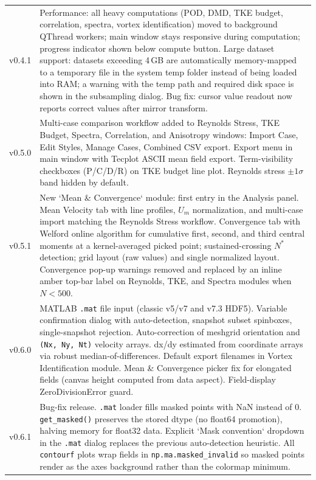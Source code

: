 \begin{longtable}{lp{12cm}}
v0.4.1 & Performance: all heavy computations (POD, DMD, TKE budget, correlation, spectra, vortex identification) moved to background QThread workers; main window stays responsive during computation; progress indicator shown below compute button. Large dataset support: datasets exceeding 4\,GB are automatically memory-mapped to a temporary file in the system temp folder instead of being loaded into RAM; a warning with the temp path and required disk space is shown in the subsampling dialog. Bug fix: cursor value readout now reports correct values after mirror transform. \\
v0.5.0 & Multi-case comparison workflow added to Reynolds Stress, TKE Budget, Spectra, Correlation, and Anisotropy windows: Import Case, Edit Styles, Manage Cases, Combined CSV export. Export menu in main window with Tecplot ASCII mean field export. Term-visibility checkboxes (P/C/D/R) on TKE budget line plot. Reynolds stress $\pm 1\sigma$ band hidden by default. \\
v0.5.1 & New `Mean \& Convergence` module: first entry in the Analysis panel. Mean Velocity tab with line profiles, $U_m$ normalization, and multi-case import matching the Reynolds Stress workflow. Convergence tab with Welford online algorithm for cumulative first, second, and third central moments at a kernel-averaged picked point; sustained-crossing $N^*$ detection; grid layout (raw values) and single normalized layout. Convergence pop-up warnings removed and replaced by an inline amber top-bar label on Reynolds, TKE, and Spectra modules when $N < 500$. \\
v0.6.0 & MATLAB \texttt{.mat} file input (classic v5/v7 and v7.3 HDF5). Variable confirmation dialog with auto-detection, snapshot subset spinboxes, single-snapshot rejection. Auto-correction of meshgrid orientation and \texttt{(Nx, Ny, Nt)} velocity arrays. dx/dy estimated from coordinate arrays via robust median-of-differences. Default export filenames in Vortex Identification module. Mean \& Convergence picker fix for elongated fields (canvas height computed from data aspect). Field-display ZeroDivisionError guard. \\
v0.6.1 & Bug-fix release. \texttt{.mat} loader fills masked points with NaN instead of 0. \texttt{get\_masked()} preserves the stored dtype (no float64 promotion), halving memory for float32 data. Explicit `Mask convention` dropdown in the \texttt{.mat} dialog replaces the previous auto-detection heuristic. All \texttt{contourf} plots wrap fields in \texttt{np.ma.masked\_invalid} so masked points render as the axes background rather than the colormap minimum. \\

\end{longtable}

